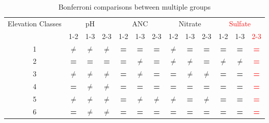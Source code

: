 \begin{table}\scriptsize
\caption{Bonferroni comparisons between multiple groups}
\begin{center}
\begin{tabular}{ccccccccccccc}
\toprule
 \multicolumn{1}{p{1cm}}{Elevation Classes}& \multicolumn{ 3}{c}{pH} & \multicolumn{ 3}{c}{ANC} & \multicolumn{ 3}{c}{Nitrate} & \multicolumn{ 3}{c}{\textcolor{red}{Sulfate}} \\ \cline{2-13}\noalign{\smallskip}
 & \multicolumn{ 1}{c}{1-2} & 1-3 & 2-3 & 1-2 & 1-3 & 2-3 & 1-2 & 1-3 & 2-3 & 1-2 & 1-3 & \textcolor{red}{2-3} \\  \cline{2-13}
\multicolumn{1}{c}{1} & \textbf{$\neq$} & \textbf{$\neq$} & \textbf{$\neq$} & \textbf{=} & \textbf{=} & \textbf{=} & \textbf{$\neq$} & \textbf{=} & \textbf{=} & \textbf{=} & \textbf{=} & \textcolor{red}{\textbf{=}} \\ 
\multicolumn{1}{c}{2} & \textbf{=} & \textbf{=} & \textbf{=} & \textbf{=} & \textbf{$\neq$} & \textbf{=} & \textbf{$\neq$} & \textbf{$\neq$} & \textbf{=} & \textbf{$\neq$} & \textbf{$\neq$} & \textcolor{red}{\textbf{=}} \\ 
\multicolumn{1}{c}{3} & \textbf{$\neq$} & \textbf{$\neq$} & \textbf{$\neq$} & \textbf{=} & \textbf{$\neq$} & \textbf{=} & \textbf{=} & \textbf{$\neq$} & \textbf{$\neq$} & \textbf{=} & \textbf{=} & \textcolor{red}{\textbf{=}} \\ 
\multicolumn{1}{c}{4} & \textbf{=} & \textbf{$\neq$} & \textbf{$\neq$} & \textbf{=} & \textbf{=} & \textbf{=} & \textbf{=} & \textbf{=} & \textbf{=} & \textbf{=} & \textbf{=} & \textcolor{red}{\textbf{=}} \\ 
\multicolumn{1}{c}{5} & \textbf{$\neq$} & \textbf{$\neq$} & \textbf{$\neq$} & \textbf{=} & \textbf{$\neq$} & \textbf{$\neq$} & \textbf{$\neq$} & \textbf{=} & \textbf{$\neq$} & \textbf{=} & \textbf{=} & \textcolor{red}{\textbf{=}} \\ 
	\multicolumn{1}{c}{6} & \textbf{=} & \textbf{$\neq$} & \textbf{$\neq$} & \textbf{=} & \textbf{=} & \textbf{=} & \textbf{=} & \textbf{=} & \textbf{=} & \textbf{=} & \textbf{=} & \textcolor{red}{\textbf{=}} \\ 
\bottomrule
\end{tabular}
\end{center}
\label{tab:Bontable}
\end{table}